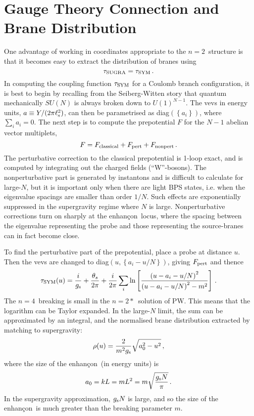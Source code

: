 \documentclass[a4paper,12pt]{amsproc}
\numberwithin{equation}{section}
\def\gs{g_{\rm{s}}}
\def\ls{\ell_{\rm{s}}}
\def\enh{enhan\c con}
\def\nef{$n{=}4$}
\def\net{$n{=}2$}
\def\nets{$n{=}2*$}
\begin{document}
\section{Gauge Theory Connection and Brane Distribution}

One advantage of working in coordinates appropriate to the \net\
structure is that it becomes easy to extract the distribution of
branes using
%
\begin{equation}
\tau_{\rm SUGRA}=\tau_{\rm SYM} \,.
\end{equation}
%
In computing the coupling function $\tau_{\rm SYM}$ for a Coulomb
branch configuration, it is best to begin by recalling from the
Seiberg-Witten story that quantum mechanically $SU(N)$ is always
broken down to $U(1)^{N-1}$.  The vevs in energy units, $a\equiv
Y/(2\pi\ls^2)$, can then be parametrised as
diag$(\left\{a_i\right\})$, where $\sum_i a_i=0$.  The next step is to
compute the prepotential $F$ for the $N-1$ abelian vector multiplets,
%
\begin{equation}
F=F_{\rm classical}+ F_{\rm pert} + F_{\rm nonpert} \,.
\end{equation}
%
The perturbative correction to the classical prepotential is 1-loop
exact, and is computed by integrating out the charged fields
(``W''-bosons).  The nonperturbative part is generated by instantons
and is difficult to calculate for large-$N$, but it is important only
when there are light BPS states, i.e. when the eigenvalue spacings are
smaller than order $1/N$.  Such effects are exponentially suppressed
in the supergravity regime where $N$ is large.  Nonperturbative
corrections turn on sharply at the \enh\ locus, where the spacing
between the eigenvalue representing the probe and those representing
the source-branes can in fact become close.

To find the perturbative part of the prepotential, place a probe at
distance $u$.  Then the vevs are changed to
diag$(u,\left\{a_i-u/N\right\})$, giving $F_{\rm pert}$ and thence
%
\begin{equation}
\tau_{\rm SYM}(u)= {{i}\over{\gs}} + {{\theta_s}\over{2\pi}}
+ {{i}\over{2\pi}} \sum_i \ln\left[ 
{{\left(u-a_i-u/N\right)^2}\over{\left(u-a_i-u/N\right)^2-m^2}}
\right] \,.
\end{equation}
%
The \nef\ breaking is small in the \nets\ solution of PW.  This means
that the logarithm can be Taylor expanded.  In the large-$N$ limit,
the sum can be approximated by an integral, and the normalised brane
distribution extracted by matching to supergravity:
%
\begin{equation}
\rho(u) = {{2}\over{m^2\gs}}\sqrt{a_0^2-u^2} \,,
\end{equation}
%
where the size of the \enh\ (in energy units) is
%
\begin{equation}
a_0=kL=mL^2=m\sqrt{{\gs N}\over{\pi}} \,.
\end{equation}
%
In the supergravity approximation, $\gs N$ is large, and so the size
of the \enh\ is much greater than the breaking parameter $m$.  
\end{document}

